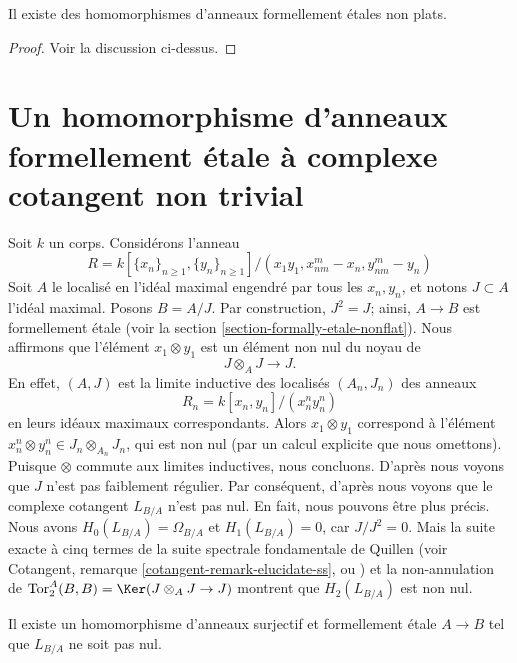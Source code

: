 \begin{lemma}
\label{lemma-formally-etale-not-presented}
Il existe des homomorphismes d'anneaux formellement \'etales non plats.
\end{lemma}

\begin{proof}
Voir la discussion ci-dessus.
\end{proof}



\section{Un homomorphisme d'anneaux formellement \'etale à complexe cotangent non trivial}
\label{section-formally-etale-nontrivial-cotangent-complex}

\noindent
Soit $k$ un corps. Considérons l'anneau
$$
R = k[\{x_n\}_{n \geq 1}, \{y_n\}_{n \geq 1}]/(
x_1y_1, x_{nm}^m - x_n, y_{nm}^m - y_n)
$$
Soit $A$ le localisé en l'idéal maximal engendré par
tous les $x_n, y_n$, et notons $J \subset A$ l'idéal maximal. Posons $B = A/J$.
Par construction, $J^2 = J$; ainsi, $A \to B$ est formellement \'etale (voir la
section \ref{section-formally-etale-nonflat}).
Nous affirmons que l'élément $x_1 \otimes y_1$ est un élément
non nul du noyau de
$$
J \otimes_A J \longrightarrow J.
$$
En effet, $(A, J)$ est la limite inductive des localisés
$(A_n, J_n)$ des anneaux
$$
R_n = k[x_n, y_n]/(x_n^n y_n^n)
$$
en leurs idéaux maximaux correspondants. Alors
$x_1 \otimes y_1$ correspond à l'élément
$x_n^n \otimes y_n^n \in J_n \otimes_{A_n} J_n$, qui est non nul
(par un calcul explicite que nous omettons). Puisque $\otimes$ commute
aux limites inductives, nous concluons. D'après
\cite[III section 3.3]{cotangent}
nous voyons que $J$ n'est pas faiblement régulier. Par conséquent, d'après
\cite[III Proposition 3.3.3]{cotangent}
nous voyons que le complexe cotangent $L_{B/A}$ n'est pas nul. En fait, nous pouvons
être plus précis. Nous avons $H_0(L_{B/A}) = \Omega_{B/A}$ et
$H_1(L_{B/A}) = 0$, car $J/J^2 = 0$. Mais la suite exacte à cinq termes
de la suite spectrale fondamentale de Quillen
(voir Cotangent, remarque \ref{cotangent-remark-elucidate-ss}, ou
\cite[Corollary 8.2.6]{Reinhard})
et la non-annulation de
$\text{Tor}_2^A(B, B) = \Ker(J \otimes_A J \to J)$ montrent que
$H_2(L_{B/A})$ est non nul.

\begin{lemma}
\label{lemma-formally-etale-nontrivial-cotangent-complex}
Il existe un homomorphisme d'anneaux surjectif et formellement \'etale $A \to B$
tel que $L_{B/A}$ ne soit pas nul.
\end{lemma}

